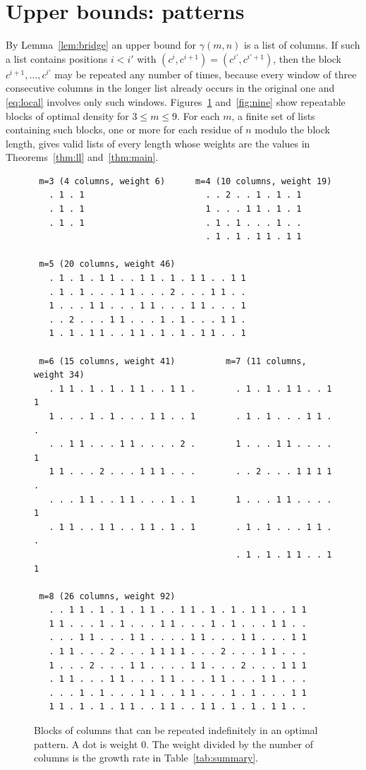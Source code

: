 \documentclass[12pt]{article}
\theoremstyle{plain}
\theoremstyle{remark}
\begin{document}
\section{Upper bounds: patterns}\label{sec:upper}

By Lemma~\ref{lem:bridge} an upper bound for $\gamma(m,n)$ is a list of columns. If such a list
contains positions $i<i'$ with $(c^{i},c^{i+1})=(c^{i'},c^{i'+1})$, then the block
$c^{i+1},\dots,c^{i'}$ may be repeated any number of times, because every window of three
consecutive columns in the longer list already occurs in the original one and \eqref{eq:local}
involves only such windows. Figures~\ref{fig:blocks} and~\ref{fig:nine} show repeatable blocks
of optimal density for $3\le m\le 9$. For each $m$, a finite set of lists containing such blocks, one or more for
each residue of $n$ modulo the block length, gives valid lists of every length whose weights
are the values in Theorems~\ref{thm:ll} and~\ref{thm:main}.

\begin{figure}[ht]
\small
\begin{verbatim}
 m=3 (4 columns, weight 6)      m=4 (10 columns, weight 19)
   . 1 . 1                        . . 2 . . 1 . 1 . 1
   . 1 . 1                        1 . . . 1 1 . 1 . 1
   . 1 . 1                        . 1 . 1 . . . 1 . .
                                  . 1 . 1 . 1 1 . 1 1

 m=5 (20 columns, weight 46)
   . 1 . 1 . 1 1 . . 1 1 . 1 . 1 1 . . 1 1
   . 1 . 1 . . . 1 1 . . . 2 . . . 1 1 . .
   1 . . . 1 1 . . . 1 1 . . . 1 1 . . . 1
   . . 2 . . . 1 1 . . . 1 . 1 . . . 1 1 .
   1 . 1 . 1 1 . . 1 1 . 1 . 1 . 1 1 . . 1

 m=6 (15 columns, weight 41)          m=7 (11 columns, weight 34)
   . 1 1 . 1 . 1 . 1 1 . . 1 1 .        . 1 . 1 . 1 1 . . 1 1
   1 . . . 1 . 1 . . . 1 1 . . 1        . 1 . 1 . . . 1 1 . .
   . . 1 1 . . . 1 1 . . . . 2 .        1 . . . 1 1 . . . . 1
   1 1 . . . 2 . . . 1 1 1 . . .        . . 2 . . . 1 1 1 1 .
   . . . 1 1 . . 1 1 . . . 1 . 1        1 . . . 1 1 . . . . 1
   . 1 1 . . 1 1 . . 1 1 . 1 . 1        . 1 . 1 . . . 1 1 . .
                                        . 1 . 1 . 1 1 . . 1 1

 m=8 (26 columns, weight 92)
   . . 1 1 . 1 . 1 . 1 1 . . 1 1 . 1 . 1 . 1 1 . . 1 1
   1 1 . . . 1 . 1 . . . 1 1 . . . 1 . 1 . . . 1 1 . .
   . . . 1 1 . . . 1 1 . . . . 1 1 . . . 1 1 . . . 1 1
   . 1 1 . . . 2 . . . 1 1 1 1 . . . 2 . . . 1 1 . . .
   1 . . . 2 . . . 1 1 . . . . 1 1 . . . 2 . . . 1 1 1
   . 1 1 . . . 1 1 . . . 1 1 . . . 1 1 . . . 1 1 . . .
   . . . 1 . 1 . . . 1 1 . . 1 1 . . . 1 . 1 . . . 1 1
   1 1 . 1 . 1 . 1 1 . . 1 1 . . 1 1 . 1 . 1 . 1 1 . .
\end{verbatim}
\caption{Blocks of columns that can be repeated indefinitely in an optimal pattern. A dot is
weight $0$. The weight divided by the number of columns is the growth rate in
Table~\ref{tab:summary}.}\label{fig:blocks}
\end{figure}
\end{document}
